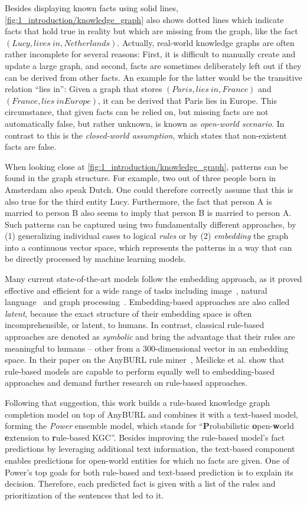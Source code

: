 Besides displaying known facts using solid lines, \autoref{fig:1_introduction/knowledge_graph} also shows dotted lines which indicate facts that hold true in reality but which are missing from the graph, like the fact $(Lucy, lives~in, Netherlands)$. Actually, real-world knowledge graphs are often rather incomplete for several reasons: First, it is difficult to manually create and update a large graph, and second, facts are sometimes deliberately left out if they can be derived from other facts. An example for the latter would be the transitive relation ``lies in'': Given a graph that stores $(Paris, lies~in, France)$ and $(France, lies~in Europe)$, it can be derived that Paris lies in Europe. This circumstance, that given facts can be relied on, but missing facts are not automatically false, but rather unknown, is known as \emph{open-world scenario}. In contrast to this is the \emph{closed-world assumption}, which states that non-existent facts are false.

When looking close at \autoref{fig:1_introduction/knowledge_graph}, patterns can be found in the graph structure. For example, two out of three people born in Amsterdam also speak Dutch. One could therefore correctly assume that this is also true for the third entity Lucy. Furthermore, the fact that person A is married to person B also seems to imply that person B is married to person A. Such patterns can be captured using two fundamentally different approaches, by (1) generalizing individual cases to logical \emph{rules} or by (2) \emph{embedding} the graph into a continuous vector space, which represents the patterns in a way that can be directly processed by machine learning models.

Many current state-of-the-art models follow the embedding approach, as it proved effective and efficient for a wide range of tasks including image~\cite{}, natural language~\cite{} and graph processing~\cite{}. Embedding-based approaches are also called \emph{latent}, because the exact structure of their embedding space is often incomprehensible, or latent, to humans. In contrast, classical rule-based approaches are denoted as \emph{symbolic} and bring the advantage that their rules are meaningful to humans -- other from a 300-dimensional vector in an embedding space. In their paper on the AnyBURL rule miner~\cite{}, Meilicke et al. show that rule-based models are capable to perform equally well to embedding-based approaches and demand further research on rule-based approaches.

Following that suggestion, this work builds a rule-based knowledge graph completion model on top of AnyBURL and combines it with a text-based model, forming the \emph{Power} ensemble model, which stands for ``\textbf{P}robabilistic \textbf{o}pen-\textbf{w}orld \textbf{e}xtension to \textbf{r}ule-based KGC''. Besides improving the rule-based model's fact predictions by leveraging additional text information, the text-based component enables predictions for open-world entities for which no facts are given. One of Power's top goals for both rule-based and text-based prediction is to explain its decision. Therefore, each predicted fact is given with a list of the rules and prioritization of the sentences that led to it.

